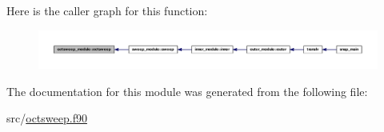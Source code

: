 Here is the caller graph for this function\-:\nopagebreak
\begin{figure}[H]
\begin{center}
\leavevmode
\includegraphics[width=350pt]{classoctsweep__module_af58dfb8973e3755aeeaa82bae73d2aef_icgraph}
\end{center}
\end{figure}




The documentation for this module was generated from the following file\-:\begin{DoxyCompactItemize}
\item 
src/\hyperlink{octsweep_8f90}{octsweep.\-f90}\end{DoxyCompactItemize}
